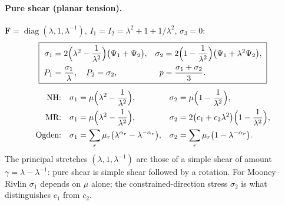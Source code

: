 \documentclass[11pt]{article}
\newcommand{\diag}{\operatorname{diag}}
\newcommand{\bF}{\bm{F}}
\newcommand{\Pone}{\Psi_{1}}
\newcommand{\Ptwo}{\Psi_{2}}
\newcommand{\Ione}{I_1}
\newcommand{\Itwo}{I_2}
\begin{document}
\paragraph{Pure shear (planar tension).}
$\bF = \diag(\lambda, 1, \lambda^{-1})$,
$\Ione = \Itwo = \lambda^2 + 1 + 1/\lambda^2$, $\sigma_3 = 0$:
\begin{equation}
  \boxed{\;
  \begin{aligned}
  \sigma_1 &= 2\Bigl(\lambda^2 - \frac1{\lambda^2}\Bigr)\bigl(\Pone + \Ptwo\bigr), &
  \sigma_2 &= 2\Bigl(1 - \frac1{\lambda^2}\Bigr)\bigl(\Pone + \lambda^2\Ptwo\bigr), \\
  P_1 &= \frac{\sigma_1}{\lambda},\quad P_2 = \sigma_2, &
  p &= \frac{\sigma_1 + \sigma_2}{3}.
  \end{aligned}\;}
  \label{eq:apppureshear}
\end{equation}
\begin{align}
  \text{NH:}\quad & \sigma_1 = \mu\Bigl(\lambda^2 - \frac1{\lambda^2}\Bigr), &
  \sigma_2 &= \mu\Bigl(1 - \frac1{\lambda^2}\Bigr), \\
  \text{MR:}\quad & \sigma_1 = \mu\Bigl(\lambda^2 - \frac1{\lambda^2}\Bigr), &
  \sigma_2 &= 2\bigl(c_1 + c_2\lambda^2\bigr)\Bigl(1 - \frac1{\lambda^2}\Bigr), \\
  \text{Ogden:}\quad & \sigma_1 = \sum_r\mu_r\bigl(\lambda^{\alpha_r} - \lambda^{-\alpha_r}\bigr), &
  \sigma_2 &= \sum_r\mu_r\bigl(1 - \lambda^{-\alpha_r}\bigr).
\end{align}
The principal stretches $(\lambda, 1, \lambda^{-1})$ are those of a simple
shear of amount $\gamma = \lambda - \lambda^{-1}$: pure shear is simple shear
followed by a rotation.  For Mooney--Rivlin $\sigma_1$ depends on $\mu$
alone; the constrained-direction stress $\sigma_2$ is what distinguishes
$c_1$ from $c_2$.
\end{document}
